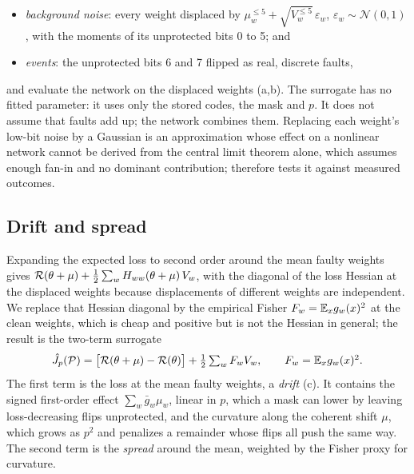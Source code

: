\begin{itemize}
\item \emph{background noise}: every weight displaced by $\mu^{\le5}_w+\sqrt{V^{\le5}_w}\,\varepsilon_w$, $\varepsilon_w\sim\mathcal N(0,1)$, with the moments of its unprotected bits 0 to 5; and
\item \emph{events}: the unprotected bits 6 and 7 flipped as real, discrete faults,
\end{itemize}
and evaluate the network on the displaced weights (a,b). The surrogate has no fitted parameter: it uses only the stored codes, the mask and $p$. It does not assume that faults add up; the network combines them. Replacing each weight's low-bit noise by a Gaussian is an approximation whose effect on a nonlinear network cannot be derived from the central limit theorem alone, which assumes enough fan-in and no dominant contribution;  therefore tests it against measured outcomes.

\subsection{Drift and spread}\label{sec:drift}
Expanding the expected loss to second order around the mean faulty weights gives $\mathcal{R}(\theta+\mu)+\tfrac12\sum_w H_{ww}(\theta+\mu)\,V_w$, with the diagonal of the loss Hessian at the displaced weights because displacements of different weights are independent. We replace that Hessian diagonal by the empirical Fisher $F_w=\mathbb{E}_x g_w(x)^2$ at the clean weights, which is cheap and positive but is not the Hessian in general; the result is the two-term surrogate
\begin{equation}\label{eq:two-term}
\hat J_p(\mathcal{P})=\big[\mathcal{R}(\theta+\mu)-\mathcal{R}(\theta)\big]+\tfrac12\textstyle\sum_w F_w V_w ,\qquad F_w=\mathbb{E}_x g_w(x)^2 .
\end{equation}
The first term is the loss at the mean faulty weights, a \emph{drift} (c). It contains the signed first-order effect $\sum_w\bar g_w\mu_w$, linear in $p$, which a mask can lower by leaving loss-decreasing flips unprotected, and the curvature along the coherent shift $\mu$, which grows as $p^2$ and penalizes a remainder whose flips all push the same way. The second term is the \emph{spread} around the mean, weighted by the Fisher proxy for curvature.

